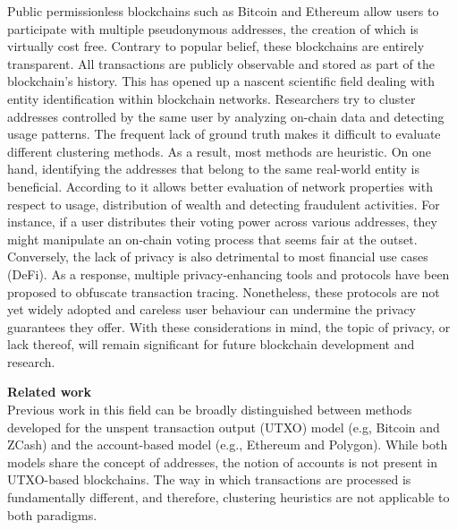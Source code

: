 \documentclass[12pt,a4paper,titlepage,oneside,english]{article}
\begin{document}
Public permissionless blockchains such as Bitcoin \citep{nakamotoBitcoin2008} and Ethereum \citep{buterin2014ethereum} allow users %
 to participate with multiple pseudonymous addresses, the creation of which is virtually cost free. Contrary to popular belief, these blockchains are entirely transparent. All transactions are publicly observable and stored as part of the blockchain's history.
This has opened up a nascent scientific field dealing with entity identification within blockchain networks. Researchers try to cluster addresses controlled by the same user by analyzing on-chain data and detecting usage patterns. The frequent lack of ground truth makes it difficult to evaluate different clustering methods. As a result, most methods are heuristic. %
\newline On one hand, identifying the addresses that belong to the same real-world entity is beneficial. According to \cite{FV:17} it allows better evaluation of network properties with respect to usage, distribution of wealth and detecting fraudulent activities. For instance, if a user distributes their voting power across various addresses, they might manipulate an on-chain voting process that seems fair at the outset. \newline
Conversely, the lack of privacy is also detrimental to most financial use cases (DeFi). As a response, multiple privacy-enhancing tools and protocols have been proposed to obfuscate transaction tracing. 
Nonetheless, these protocols are not yet widely adopted and careless user behaviour can undermine the privacy guarantees they offer. \newline
With these considerations in mind, the topic of privacy, or lack thereof, will remain significant for future blockchain development and research.


\textbf{Related work}\\
Previous work in this field can be broadly distinguished between methods developed for the unspent transaction output (UTXO) model (e.g, Bitcoin and ZCash) and the account-based model (e.g., Ethereum and Polygon). While both models share the concept of addresses, the notion of accounts is not present in UTXO-based blockchains. The way in which transactions are processed is fundamentally different, and therefore, clustering heuristics are not applicable to both paradigms.
\end{document}
